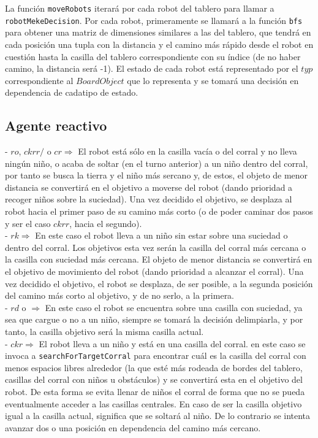 \documentclass[a4paper,12pt]{article}
\def\code#1{\texttt{#1}}
\begin{document}
La función \code{moveRobots} iterará por cada robot del tablero para llamar a \code{robotMekeDecision}. Por cada robot, primeramente se llamará a la función \code{bfs} para obtener una matriz de dimensiones similares a las del tablero, que tendrá en cada posición una tupla con la distancia y el camino más rápido desde el robot en cuestión hasta la casilla del tablero correspondiente con su índice (de no haber camino, la distancia será -1). El estado de cada robot está representado por el $typ$ correspondiente al $BoardObject$ que lo representa y se tomará una decisión en dependencia de cadatipo de estado. \\

\subsection*{Agente reactivo}
- $ro$, $ckrr/$ o $cr \Longrightarrow$ El robot está sólo en la casilla vacía o del corral  y no lleva ningún niño, o acaba de soltar (en el turno anterior) a un niño dentro del corral, por tanto se busca la tierra y el niño más sercano y, de estos, el objeto de menor distancia se convertirá en el objetivo a moverse del robot (dando prioridad a recoger niños sobre la suciedad). Una vez decidido el objetivo, se desplaza al robot hacia el primer paso de su camino más corto (o de poder caminar dos pasos y ser el caso $ckrr$, hacia el segundo).\\
- $rk \Longrightarrow$ En este caso el robot lleva a un niño sin estar sobre una suciedad o dentro del corral. Los objetivos esta vez serán la casilla del corral más cercana o la casilla con suciedad más cercana. El objeto de menor distancia se convertirá en el objetivo de movimiento del robot (dando prioridad a alcanzar el corral). Una vez decidido el objetivo, el robot se desplaza, de ser posible, a la segunda posición del camino más corto al objetivo, y de no serlo, a la primera.\\
- $rd$ o $ \Longrightarrow$ En este caso el robot se encuentra sobre una casilla con suciedad, ya sea que cargue o no a un niño, siempre se tomará la decisión delimpiarla, y por tanto, la casilla objetivo será la misma casilla actual.\\
- $ckr \Longrightarrow$ El robot lleva a un niño y está en una casilla del corral. en este caso se invoca a \code{searchForTargetCorral} para encontrar cuál es la casilla del corral con menos espacios libres alrededor (la que esté más rodeada de bordes del tablero, casillas del corral con niños u obstáculos) y se convertirá esta en el objetivo del robot. De esta forma se evita llenar de niños el corral de forma que no se pueda eventualmente acceder a las casillas centrales. En caso de ser la casilla objetivo igual a la casilla actual, significa que se soltará al niño. De lo contrario se intenta avanzar dos o una posición en dependencia del camino más cercano.\\
\end{document}
